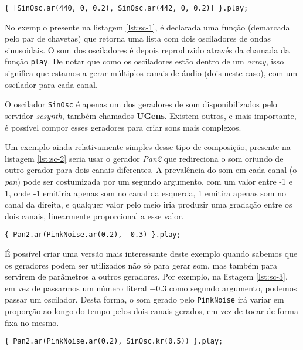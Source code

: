 \begin{lstlisting}[caption={Declaração de dois canais de aúdio com base em dois osciladores},label={lst:sc-1}]
{ [SinOsc.ar(440, 0, 0.2), SinOsc.ar(442, 0, 0.2)] }.play;
\end{lstlisting}

No exemplo presente na listagem \ref{lst:sc-1}, é declarada uma função (demarcada pelo par de chavetas) que retorna uma lista com dois osciladores de ondas sinusoidais. O som dos osciladores é depois reproduzido através da chamada da função \texttt{play}. De notar que como os osciladores estão dentro de um \textit{array}, isso significa que estamos a gerar múltiplos canais de áudio (dois neste caso), com um oscilador para cada canal.

O oscilador \texttt{SinOsc} é apenas um dos geradores de som disponibilizados pelo servidor \textit{scsynth}, também chamados \textbf{UGens}. Existem outros, e mais importante, é possível compor esses geradores para criar sons mais complexos.

Um exemplo ainda relativamente simples desse tipo de composição, presente na listagem \ref{lst:sc-2} seria usar o gerador \textit{Pan2} que redireciona o som oriundo de outro gerador para dois canais diferentes. A prevalência do som em cada canal (o \textit{pan}) pode ser costumizada por um segundo argumento, com um valor entre -1 e 1, onde -1 emitiria apenas som no canal da esquerda, 1 emitira apenas som no canal da direita, e qualquer valor pelo meio iria produzir uma gradação entre os dois canais, linearmente proporcional a esse valor.

\begin{lstlisting}[caption={Dividir um gerador por dois canais de forma desigual},label={lst:sc-2}]
{ Pan2.ar(PinkNoise.ar(0.2), -0.3) }.play;
\end{lstlisting}

É possível criar uma versão mais interessante deste exemplo quando sabemos que os geradores podem ser utilizados não só para gerar som, mas também para servirem de parâmetros a outros geradores. Por exemplo, na listagem \ref{lst:sc-3}, em vez de passarmos um número literal $-0.3$ como segundo argumento, podemos passar um oscilador. Desta forma, o som gerado pelo \texttt{PinkNoise} irá variar em proporção ao longo do tempo pelos dois canais gerados, em vez de tocar de forma fixa no mesmo.

\begin{lstlisting}[caption={Dividir um gerador por dois canais de forma desigual},label={lst:sc-3}]
{ Pan2.ar(PinkNoise.ar(0.2), SinOsc.kr(0.5)) }.play;
\end{lstlisting}

